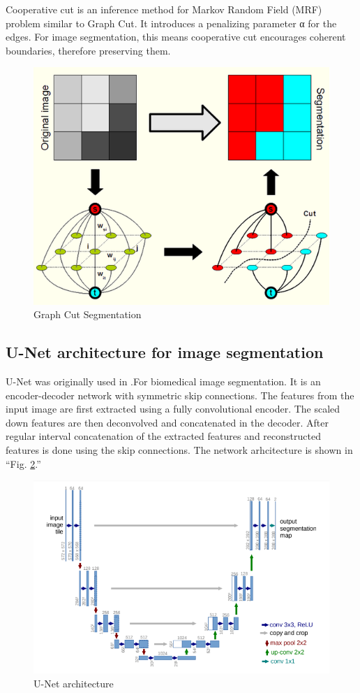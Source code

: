 \documentclass[conference]{IEEEtran}
\begin{document}
Cooperative cut \cite{CoopCut} is an inference method for Markov Random Field (MRF) problem similar to Graph Cut. It introduces a penalizing parameter α for the edges. For image segmentation, this means cooperative cut encourages coherent boundaries, therefore preserving them.
\begin{figure}[htbp]
\centerline{\includegraphics[width=\linewidth]{graph_cut}}
\caption{Graph Cut Segmentation}
\label{fig:graph_cut}
\end{figure}
\subsection{U-Net architecture for image segmentation } \label{un}
U-Net was originally used in \cite{unet} .For biomedical image segmentation. It is an encoder-decoder network with symmetric skip connections. The features from the input image are first extracted using a fully convolutional encoder. The scaled down features are then deconvolved and concatenated in the decoder. After regular interval concatenation of the extracted features and reconstructed features is done using the skip connections. The network arhcitecture is shown in ``Fig. \ref{fig:unet}.'' \\

\begin{figure}[htbp]
\centerline{\includegraphics[width=\linewidth]{U-net}}
\caption{U-Net architecture}
\label{fig:unet}
\end{figure}
\end{document}
